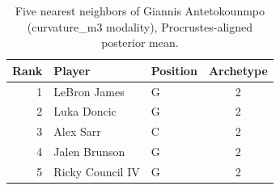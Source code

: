\begin{table}[htbp]
  \centering\small
  \begin{tabular}{rllc}
    \toprule
    Rank & Player & Position & Archetype \\
    \midrule
    1 & LeBron James & G & 2 \\
    2 & Luka Doncic & G & 2 \\
    3 & Alex Sarr & C & 2 \\
    4 & Jalen Brunson & G & 2 \\
    5 & Ricky Council IV & G & 2 \\
    \bottomrule
  \end{tabular}
  \caption{Five nearest neighbors of Giannis Antetokounmpo (curvature_m3 modality), Procrustes-aligned posterior mean.}
  \label{tab:Giannis_Antetokounmpo_neighbors_curvature_m3}
\end{table}

